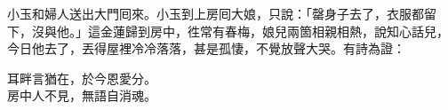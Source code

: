小玉和婦人送出大門囘來。小玉到上房囘大娘，只說：「罄身子去了，衣服都留下，沒與他。」這金蓮歸到房中，徃常有春梅，娘兒兩箇相親相熱，說知心話兒，今日他去了，丟得屋裡冷冷落落，甚是孤悽，不覺放聲大哭。有詩為證：

\begin{myquote}
耳畔言猶在，於今恩愛分。\\房中人不見，無語自消魂。
\end{myquote}


